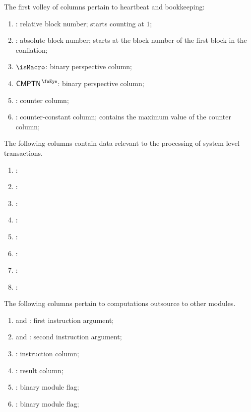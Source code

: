 The first volley of columns pertain to heartbeat and bookkeeping:
\begin{enumerate}
	\item
		\relBlock{}:
		relative block number;
		starts counting at $1$;
	\item
		\absBlock{}:
		absolute block number;
		starts at the block number of the first block in the conflation;
	\item
		$\isMacro$:
		binary perspective column;
	\item
		$\isComputation$:
		binary perspective column;
	\item
		\ct{}:
		counter column;
	\item
		\maxCt{}:
		counter-constant column;
		contains the maximum value of the counter column;
\end{enumerate}
The following columns contain data relevant to the processing of system level transactions.
\begin{enumerate}[resume]
	\item
		\godGiven{}
		\layerOneTimeStamp{}:
	\item
		\godGiven{}
		\beaconRootHi{}:
	\item
		\godGiven{}
		\beaconRootLo{}:
	\item
		\godGiven{}
		\previousBlockNumber{}:
	\item
		\godGiven{}
		\previousBlockHashHi{}:
	\item
		\godGiven{}
		\previousBlockHashLo{}:
	\item
		\markAsJustifiedHere{}
		\layerOneTimeStampModulo{}:
	\item
		\markAsJustifiedHere{}
		\previousBlockNumberModulo{}:
\end{enumerate}
The following columns pertain to computations outsource to other modules.
\begin{enumerate}[resume]
	\item
		\computationArgOneHi{} and \computationArgOneLo{}:
		first instruction argument;
	\item
		\computationArgTwoHi{} and \computationArgTwoLo{}:
		second instruction argument;
	\item
		\computationInst:
		instruction column;
	\item
		\computationRes:
		result column;
	\item
		\computationWcpFlag:
		binary \wcpMod{} module flag;
	\item
		\computationEucFlag:
		binary \eucMod{} module flag;
\end{enumerate}
